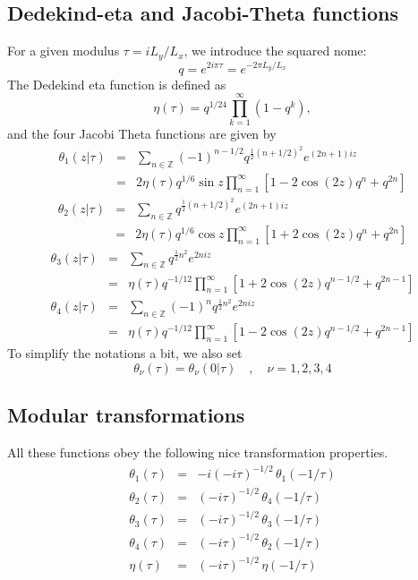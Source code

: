 \documentclass[11pt]{iopart}
\begin{document}
\subsection[\;\;\;\;\;\;\;\;\;\;\;\;\;\;Dedekind-eta and Jacobi-Theta functions]{Dedekind-eta and Jacobi-Theta functions}
\label{sec:functions}
For a given modulus $\tau=i L_y/L_x$, we introduce the squared nome:
\begin{equation}
 q=e^{2i\pi \tau}=e^{-2\pi L_y/L_x}
\end{equation}
The Dedekind eta function is defined as 
\begin{equation}
 \eta(\tau)=q^{1/ 24}\prod_{k=1}^{\infty}\left(1-q^k\right),
\end{equation}
and the four Jacobi Theta functions are given by
\begin{eqnarray}
 \theta_1(z|\tau)&=&\sum_{n \in \mathbb{Z}}(-1)^{n-1/2}q^{\frac{1}{2}(n+1/2)^2}e^{(2n+1)iz}\\
 &=&2\eta(\tau)q^{1/6} \sin z\prod_{n=1}^{\infty} \left[1-2 \cos(2z) q^{n}+q^{2n}\right]
\end{eqnarray}
\begin{eqnarray}
 \theta_2(z|\tau)&=&\sum_{n \in \mathbb{Z}}q^{\frac{1}{2}(n+1/2)^2}e^{(2n+1)iz}\\
 &=&2\eta(\tau)q^{1/6} \cos z\prod_{n=1}^{\infty} \left[1+2 \cos(2z) q^{n}+q^{2n}\right]
\end{eqnarray}
\begin{eqnarray}
 \theta_3(z|\tau)&=&\sum_{n \in \mathbb{Z}}q^{\frac{1}{2}n^2}e^{2niz}\\
 &=&\eta(\tau)q^{-1/12}\prod_{n=1}^{\infty} \left[1+2 \cos(2z) q^{n-1/2}+q^{2n-1}\right]
\end{eqnarray}
\begin{eqnarray}
 \theta_4(z|\tau)&=&\sum_{n \in \mathbb{Z}}(-1)^{n}q^{\frac{1}{2}n^2}e^{2niz}\\
 &=&\eta(\tau)q^{-1/12}\prod_{n=1}^{\infty} \left[1-2 \cos(2z) q^{n-1/2}+q^{2n-1}\right]
\end{eqnarray}
To simplify the notations a bit, we also set
\begin{equation}
 \theta_\nu(\tau)=\theta_\nu (0|\tau)\quad,\quad \nu=1,2,3,4
\end{equation}
\subsection[\;\;\;\;\;\;\;\;\;\;\;\;\;\;Modular transformations]{Modular transformations}
\label{sec:modular}
All these functions obey the following nice transformation properties. 
\begin{eqnarray}
 \theta_1(\tau)&=&-i (-i \tau )^{-1/2}\,\theta_1(-1/\tau)\\
 \theta_2(\tau)&=&(-i \tau )^{-1/2}\,\theta_4(-1/\tau)\\
 \theta_3(\tau)&=&(-i \tau )^{-1/2}\,\theta_3(-1/\tau)\\
 \theta_4(\tau)&=&(-i \tau )^{-1/2}\,\theta_2(-1/\tau)\\
 \eta(\tau)&=&(-i \tau )^{-1/2}\,\eta(-1/\tau)
\end{eqnarray}
\end{document}
